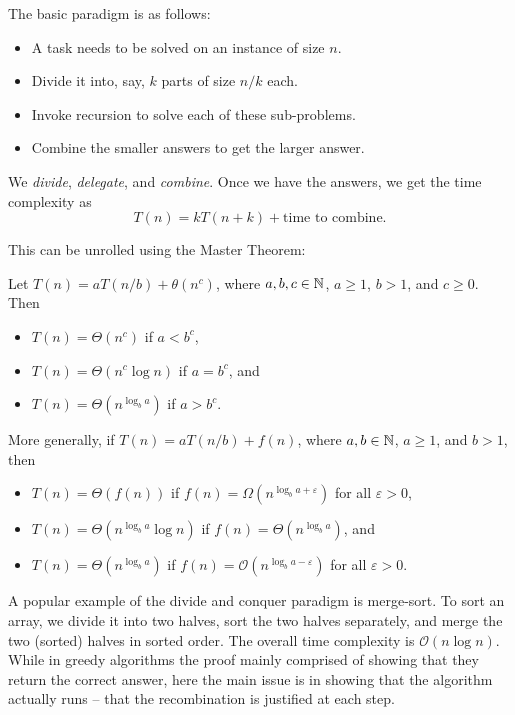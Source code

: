 The basic paradigm is as follows:
\begin{itemize}
	\item A task needs to be solved on an instance of size $n$.
	\item Divide it into, say, $k$ parts of size $n/k$ each.
	\item Invoke recursion to solve each of these sub-problems.
	\item Combine the smaller answers to get the larger answer.
\end{itemize}

We \textit{divide}, \textit{delegate}, and \textit{combine}. Once we have the answers, we get the time complexity as
\[ T(n) = k T(n+k) + \text{time to combine}. \]

This can be unrolled using the Master Theorem:

\begin{theorem}
	Let $T(n)=a T(n/b) + \theta(n^c)$, where $a,b,c\in\mathbb{N}$, $a\geq 1$, $b>1$, and $c\geq 0$. Then
	\begin{itemize}
		\item $T(n)=\Theta(n^c)$ if $a<b^c$,
		\item $T(n)=\Theta(n^c\log n)$ if $a=b^c$, and
		\item $T(n)=\Theta(n^{\log_b a})$ if $a>b^c$.
	\end{itemize}
	More generally, if $T(n)=a T(n/b) + f(n)$, where $a,b\in\mathbb{N}$, $a\geq 1$, and $b>1$, then
	\begin{itemize}
		\item $T(n)=\Theta(f(n))$ if $f(n) = \Omega(n^{\log_b a + \varepsilon})$ for all $\varepsilon>0$,
		\item $T(n)=\Theta(n^{\log_b a}\log n)$ if $f(n) = \Theta(n^{\log_b a})$, and
		\item $T(n)=\Theta(n^{\log_b a})$ if $f(n) = \mathcal{O}(n^{\log_b a - \varepsilon})$ for all $\varepsilon>0$.
	\end{itemize}
\end{theorem}

A popular example of the divide and conquer paradigm is merge-sort. To sort an array, we divide it into two halves, sort the two halves separately, and merge the two (sorted) halves in sorted order. The overall time complexity is $\mathcal{O}(n\log n)$. \\

While in greedy algorithms the proof mainly comprised of showing that they return the correct answer, here the main issue is in showing that the algorithm actually runs -- that the recombination is justified at each step.

